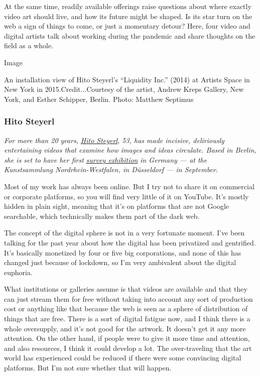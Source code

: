 At the same time, readily available offerings raise questions about
where exactly video art should live, and how its future might be shaped.
Is its star turn on the web a sign of things to come, or just a
momentary detour? Here, four video and digital artists talk about
working during the pandemic and share thoughts on the field as a whole.

Image

An installation view of Hito Steyerl's ``Liquidity Inc.'' (2014) at
Artists Space in New York in 2015.Credit...Courtesy of the artist,
Andrew Kreps Gallery, New York, and Esther Schipper, Berlin. Photo:
Matthew Septimus

\hypertarget{hito-steyerl}{%
\subsubsection{\texorpdfstring{\textbf{Hito
Steyerl}}{Hito Steyerl}}\label{hito-steyerl}}

\emph{For more than 20 years,}
\href{https://www.nytimes3xbfgragh.onion/2017/12/15/arts/design/hito-steyerl.html}{\emph{Hito
Steyerl}}\emph{, 53, has made incisive, deliriously entertaining videos
that examine how images and ideas circulate. Based in Berlin, she is set
to have her first}
\href{https://www.kunstsammlung.de/de/exhibitions/hito-steyerl}{\emph{survey
exhibition}} \emph{in Germany --- at the Kunstsammlung
Nordrhein-Westfalen, in Düsseldorf --- in September.}

Most of my work has always been online. But I try not to share it on
commercial or corporate platforms, so you will find very little of it on
YouTube. It's mostly hidden in plain sight, meaning that it's on
platforms that are not Google searchable, which technically makes them
part of the dark web.

The concept of the digital sphere is not in a very fortunate moment.
I've been talking for the past year about how the digital has been
privatized and gentrified. It's basically monetized by four or five big
corporations, and none of this has changed just because of lockdown, so
I'm very ambivalent about the digital euphoria.

What institutions or galleries assume is that videos are available and
that they can just stream them for free without taking into account any
sort of production cost or anything like that because the web is seen as
a sphere of distribution of things that are free. There is a sort of
digital fatigue now, and I think there is a whole oversupply, and it's
not good for the artwork. It doesn't get it any more attention. On the
other hand, if people were to give it more time and attention, and also
resources, I think it could develop a lot. The over-traveling that the
art world has experienced could be reduced if there were some convincing
digital platforms. But I'm not sure whether that will happen.

